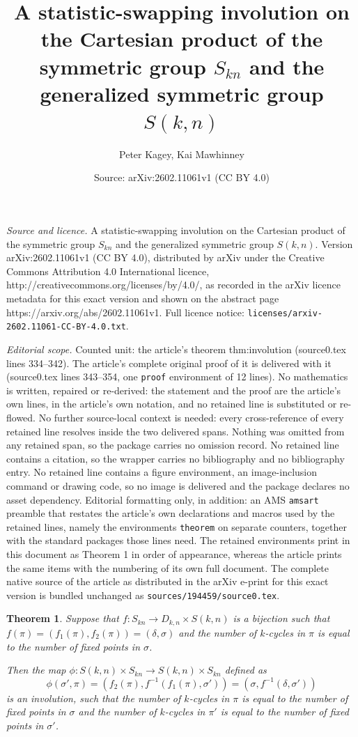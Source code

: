 \documentclass[10pt,a4paper]{amsart}
\title{A statistic-swapping involution on the Cartesian product of the symmetric group \texorpdfstring{$S_{kn}$}{on kn letters} and the generalized symmetric group \texorpdfstring{$S(k,n)$}{S(k,n)}}
\author{Peter Kagey, Kai Mawhinney}
\date{Source: arXiv:2602.11061v1 (CC BY 4.0)}
\newtheorem{theorem}{Theorem}
\begin{document}
\maketitle

\noindent\emph{Source and licence.} A statistic-swapping involution on the Cartesian product of the symmetric group \texorpdfstring{$S_{kn}$}{on kn letters} and the generalized symmetric group \texorpdfstring{$S(k,n)$}{S(k,n)}. Version arXiv:2602.11061v1 (CC BY 4.0), distributed by arXiv under the Creative Commons Attribution 4.0 International licence, http://creativecommons.org/licenses/by/4.0/, as recorded in the arXiv licence metadata for this exact version and shown on the abstract page https://arxiv.org/abs/2602.11061v1. Full licence notice: \texttt{licenses/arxiv-2602.11061-CC-BY-4.0.txt}.\par\smallskip

\noindent\textit{Editorial scope.} Counted unit: the article's theorem thm:involution (source0.tex lines 334--342). The article's complete original proof of it is delivered with it (source0.tex lines 343--354, one \texttt{proof} environment of 12 lines). No mathematics is written, repaired or re-derived: the statement and the proof are the article's own lines, in the article's own notation, and no retained line is substituted or re-flowed.  No further source-local context is needed: every cross-reference of every retained line resolves inside the two delivered spans.  Nothing was omitted from any retained span, so the package carries no omission record.  No retained line contains a citation, so the wrapper carries no bibliography and no bibliography entry.  No retained line contains a figure environment, an image-inclusion command or drawing code, so no image is delivered and the package declares no asset dependency.  Editorial formatting only, in addition: an AMS \texttt{amsart} preamble that restates the article's own declarations and macros used by the retained lines, namely the environments \texttt{theorem} on separate counters, together with the standard packages those lines need.  The retained environments print in this document as Theorem 1 in order of appearance, whereas the article prints the same items with the numbering of its own full document.  The complete native source of the article as distributed in the arXiv e-print for this exact version is bundled unchanged as \texttt{sources/194459/source0.tex}.
\begin{theorem}\label{thm:involution}
    Suppose that $f\colon S_{kn} \to D_{k,n} \times S(k,n)$ is a bijection such that $f(\pi) = \left(f_1(\pi), f_2(\pi)\right) = (\delta, \sigma)$ and the number of $k$-cycles in $\pi$ is equal to the number of fixed points in $\sigma$.

    Then the map $\phi \colon S(k,n) \times S_{kn} \to S(k,n) \times S_{kn}$ defined as \[
        \phi(\sigma', \pi) = \left(f_2(\pi),f^{-1}(f_1(\pi),\sigma')\right)
        = \left(\sigma, f^{-1}(\delta, \sigma')\right)
    \]
    is an involution, such that the number of $k$-cycles in $\pi$ is equal to the number of fixed points in $\sigma$ and the number of $k$-cycles in $\pi'$ is equal to the number of fixed points in $\sigma'$.
\end{theorem}
\end{document}
